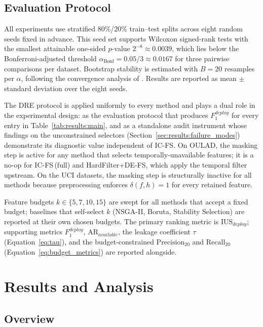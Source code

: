\documentclass[a4paper,fleqn]{cas-sc}
\begin{document}
\subsection{Evaluation Protocol}
\label{sec:exp:protocol}
 
All experiments use stratified 80\%/20\% train--test splits across eight random seeds fixed in advance. This seed set supports Wilcoxon signed-rank tests \citep{wilcoxon1945} with the smallest attainable one-sided $p$-value $2^{-8} \approx 0.0039$, which lies below the Bonferroni-adjusted threshold $\alpha_{\text{Bonf}} = 0.05/3 \approx 0.0167$ for three pairwise comparisons per dataset. Bootstrap stability is estimated with $B=20$ resamples per $\alpha$, following the convergence analysis of \citet{pes2020}. Results are reported as mean $\pm$ standard deviation over the eight seeds.
 
The DRE protocol is applied uniformly to every method and plays a dual role in the experimental design: as the evaluation protocol that produces $F_1^{deploy}$ for every entry in Table~\ref{tab:results:main}, and as a standalone audit instrument whose findings on the unconstrained selectors (Section~\ref{sec:results:failure_modes}) demonstrate its diagnostic value independent of IC-FS. On OULAD, the masking step is active for any method that selects temporally-unavailable features; it is a no-op for IC-FS\,(full) and HardFilter+DE-FS, which apply the temporal filter upstream. On the UCI datasets, the masking step is structurally inactive for all methods because preprocessing enforces $\delta(f,h)=1$ for every retained feature.
 
Feature budgets $k \in \{5, 7, 10, 15\}$ are swept for all methods that accept a fixed budget; baselines that self-select $k$ (NSGA-II, Boruta, Stability Selection) are reported at their own chosen budgets. The primary ranking metric is $\mathrm{IUS}_{deploy}$; supporting metrics $F_1^{deploy}$, $\mathrm{AR}_{available}$, the leakage coefficient $\tau$ (Equation~\ref{eq:tau}), and the budget-constrained $\mathrm{Precision}_{20}$ and $\mathrm{Recall}_{20}$ (Equation~\ref{eq:budget_metrics}) are reported alongside.
\section{Results and Analysis}
\label{sec:results}
 
\subsection{Overview}
\label{sec:results:overview}
 
\end{document}
